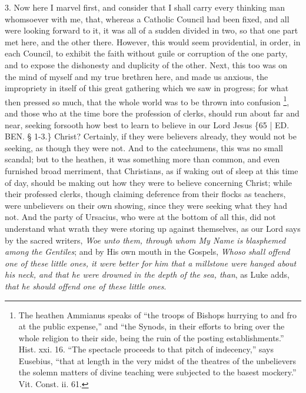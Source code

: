 3. Now here I marvel first,
and consider that I shall carry every thinking man whomsoever with me,
that, whereas a Catholic Council had been fixed, and all were looking
forward to it, it was all of a sudden divided in two, so that one part
met here, and the other there. However, this would seem providential,
in order, in each Council, to exhibit the faith without guile or
corruption of the one party, and to expose the dishonesty and
duplicity of the other. Next, this too was on the mind of myself and
my true brethren here, and made us anxious, the impropriety in itself
of this great gathering which we saw in progress; for what then
pressed so much, that the whole world was to be thrown into confusion
\footnote{The heathen Ammianus speaks of ``the troops of Bishops hurrying to and
fro at the public expense,'' and ``the Synods, in their efforts to bring
over the whole religion to their side, being the ruin of the posting
establishments.'' Hist. xxi. 16. ``The spectacle proceeds to that pitch
of indecency,'' says Eusebius, ``that at length in the very midst of the
theatres of the unbelievers the solemn matters of divine teaching were
subjected to the basest mockery.'' Vit. Const. ii. 61.}, and those who at the
time bore the profession of clerks, should run about far and near,
seeking forsooth how best to learn to believe in our Lord Jesus \{65 |
ED.
BEN. § 1-3.\} Christ? Certainly, if they were
believers already, they would not be seeking, as though they were not.
And to the catechumens, this was no small scandal; but to the heathen,
it was something more than common, and even furnished broad merriment,
that Christians, as if waking out of sleep at this time of day, should
be making out how they were to believe concerning Christ; while their
professed clerks, though claiming deference from their flocks as
teachers, were unbelievers on their own showing, since they were
seeking what they had not. And the party of Ursacius, who were at the
bottom of all this, did not understand what wrath they were storing up
against themselves, as our Lord says by the sacred writers, \emph{Woe
unto them, through whom My Name is blasphemed among the Gentiles};
and by His own mouth in the Gospels, \emph{Whoso shall offend one of
these little ones, it were better for him that a millstone were hanged
about his neck, and that he were drowned in the depth of the sea, than},
as Luke adds, \emph{that he should offend one of these little ones}.

